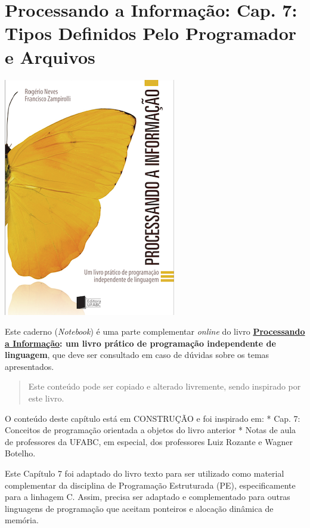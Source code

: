 \documentclass[12pt,a4paper]{article}
\begin{document}
    \hypertarget{processando-a-informauxe7uxe3o-cap.-7-tipos-definidos-pelo-programador-e-arquivos}{%
\section{Processando a Informação: Cap. 7: Tipos Definidos Pelo
Programador e
Arquivos}\label{processando-a-informauxe7uxe3o-cap.-7-tipos-definidos-pelo-programador-e-arquivos}}

    \includegraphics{"figs/Capa_Processando_Informacao.jpg"}

Este caderno (\emph{Notebook}) é uma parte complementar \emph{online} do
livro
\textbf{\href{https://editora.ufabc.edu.br/matematica-e-ciencias-da-computacao/58-processando-a-informacao}{Processando
a Informação}: um livro prático de programação independente de
linguagem}, que deve ser consultado em caso de dúvidas sobre os temas
apresentados.

\begin{quote}
Este conteúdo pode ser copiado e alterado livremente, sendo inspirado
por este livro.
\end{quote}

    O conteúdo deste capítulo está em CONSTRUÇÃO e foi inspirado em: * Cap.
7: Conceitos de programação orientada a objetos do livro anterior *
Notas de aula de professores da UFABC, em especial, dos professores Luiz
Rozante e Wagner Botelho.

Este Capítulo 7 foi adaptado do livro texto para ser utilizado como
material complementar da disciplina de Programação Estruturada (PE),
especificamente para a linhagem C. Assim, precisa ser adaptado e
complementado para outras linguagens de programação que aceitam
ponteiros e alocação dinâmica de memória.
\end{document}
